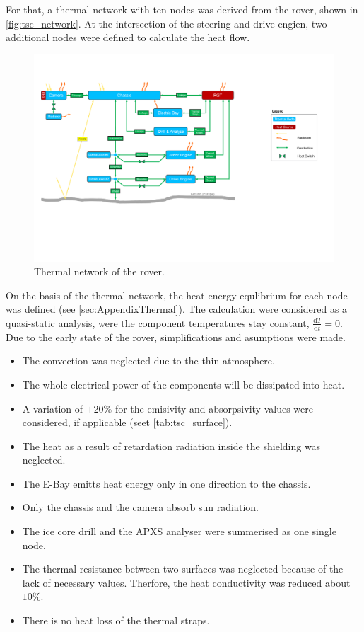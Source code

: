 For that, a thermal network with ten nodes was derived from the rover, shown in \autoref{fig:tsc_network}.
At the intersection of the steering and drive engien, two additional nodes were defined to calculate the heat flow.


\begin{figure}[H]
	\centering
	\includegraphics[width=1\textwidth]{Media/tsc_network}
	\caption{Thermal network of the rover.}
	\label{fig:tsc_network}
\end{figure}

On the basis of the thermal network, the heat energy equlibrium for each node was defined (see \autoref{sec:AppendixThermal}).
The calculation were considered as a quasi-static analysis, were the component temperatures stay constant, $\frac{\text{d}T}{\text{d}t}=0$.
Due to the early state of the rover, simplifications and asumptions were made.
\begin{itemize}
	\item The convection was neglected due to the thin atmosphere.
	\item The whole electrical power of the components will be dissipated into heat.
	\item A variation of $\pm 20\%$ for the emisivity and absorpsivity values were considered, if applicable (seet \autoref{tab:tsc_surface}).
	\item The heat as a result of retardation radiation inside the shielding was neglected.
	\item The E-Bay emitts heat energy only in one direction to the chassis.
	\item Only the chassis and the camera absorb sun radiation.
	\item The ice core drill and the APXS analyser were summerised as one single node.
	\item The thermal resistance between two surfaces was neglected because of the lack of necessary values. Therfore, the heat conductivity was reduced about $10\%$.
	\item There is no heat loss of the thermal straps.
\end{itemize}



